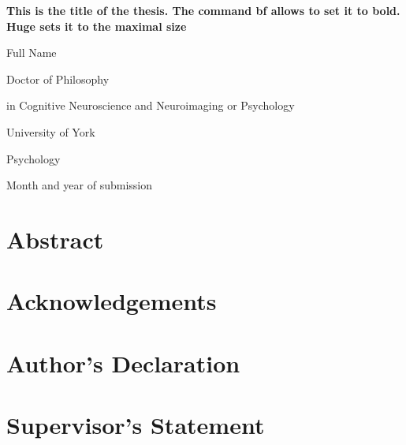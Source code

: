 \documentclass[
]{article}
\author{}
\date{\vspace{-2.5em}}
\begin{document}
\begin{centering} 

\Huge
{\bf This is the title of the thesis. The command bf allows to set it to bold. Huge sets it to the maximal size}

\vspace{5cm}
\huge
{Full Name}

\LARGE
{Doctor of Philosophy}

\vspace{-0.5cm}
\LARGE
{in Cognitive Neuroscience and Neuroimaging or Psychology}

\vspace{4cm}
\LARGE
{University of York}

\vspace{-0.5cm}
\LARGE
{Psychology}

\vspace{1cm}
\LARGE
{Month and year of submission}

\end{centering}

\pagebreak

\setcounter{page}{2}

\hypertarget{abstract}{%
\section*{Abstract}\label{abstract}}

\pagebreak

\setcounter{tocdepth}{5}
\tableofcontents
\pagebreak
\listoffigures
\pagebreak
\listoftables

\pagebreak

\hypertarget{acknowledgements}{%
\section*{Acknowledgements}\label{acknowledgements}}

\pagebreak

\hypertarget{authors-declaration}{%
\section*{Author's Declaration}\label{authors-declaration}}

\pagebreak

\hypertarget{supervisors-statement}{%
\section*{Supervisor's Statement}\label{supervisors-statement}}
\end{document}
